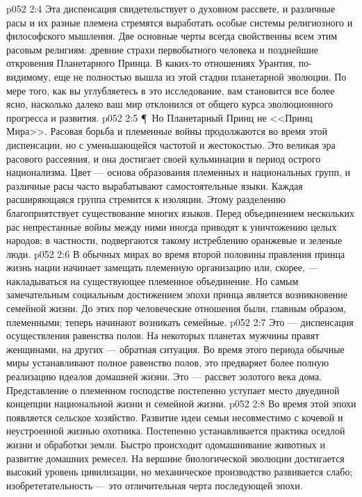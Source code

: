 \vs p052 2:4 Эта диспенсация свидетельствует о духовном рассвете, и различные расы и их разные племена стремятся выработать особые системы религиозного и философского мышления. Две основные черты всегда свойственны всем этим расовым религиям: древние страхи первобытного человека и позднейшие откровения Планетарного Принца. В каких\hyp{}то отношениях Урантия, по\hyp{}видимому, еще не полностью вышла из этой стадии планетарной эволюции. По мере того, как вы углубляетесь в это исследование, вам становится все более ясно, насколько далеко ваш мир отклонился от общего курса эволюционного прогресса и развития.
\vs p052 2:5 \P\ Но Планетарный Принц не <<Принц Мира>>. Расовая борьба и племенные войны продолжаются во время этой диспенсации, но с уменьшающейся частотой и жестокостью. Это великая эра расового рассеяния, и она достигает своей кульминации в период острого национализма. Цвет --- основа образования племенных и национальных групп, и различные расы часто вырабатывают самостоятельные языки. Каждая расширяющаяся группа стремится к изоляции. Этому разделению благоприятствует существование многих языков. Перед объединением нескольких рас непрестанные войны между ними иногда приводят к уничтожению целых народов; в частности, подвергаются такому истреблению оранжевые и зеленые люди.
\vs p052 2:6 В обычных мирах во время второй половины правления принца жизнь нации начинает замещать племенную организацию или, скорее, --- накладываться на существующее племенное объединение. Но самым замечательным социальным достижением эпохи принца является возникновение семейной жизни. До этих пор человеческие отношения были, главным образом, племенными; теперь начинают возникать семейные.
\vs p052 2:7 Это --- диспенсация осуществления равенства полов. На некоторых планетах мужчины правят женщинами, на других --- обратная ситуация. Во время этого периода обычные миры устанавливают полное равенство полов, это предваряет более полную реализацию идеалов домашней жизни. Это --- рассвет золотого века дома. Представление о племенном господстве постепенно уступает место двуединой концепции национальной жизни и семейной жизни.
\vs p052 2:8 Во время этой эпохи появляется сельское хозяйство. Развитие идеи семьи несовместимо с кочевой и неустроенной жизнью охотника. Постепенно устанавливается практика оседлой жизни и обработки земли. Быстро происходит одомашнивание животных и развитие домашних ремесел. На вершине биологической эволюции достигается высокий уровень цивилизации, но механическое производство развивается слабо; изобрететательность --- это отличительная черта последующей эпохи.
